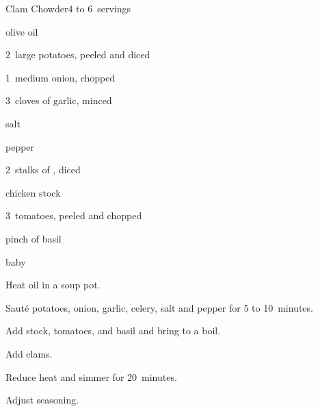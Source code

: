 \begin{recipe}{Clam Chowder}{}{4 to 6~servings}

\begin{ingredients}
\item {} olive oil
\item 2~large potatoes, peeled and diced
\item 1~medium onion, chopped
\item 3~cloves of garlic, minced
\item salt
\item pepper
\item 2~stalks of , diced
\item {} chicken stock
\item 3~tomatoes, peeled and chopped
\item pinch of basil
\item {} baby 
\end{ingredients}

\begin{directions}
\item Heat oil in a soup pot.
\item Sauté potatoes, onion, garlic, celery, salt and pepper for 5 to 10~minutes.
\item Add stock, tomatoes, and basil and bring to a boil.
\item Add clams.
\item Reduce heat and simmer for 20~minutes.
\item Adjust seasoning.
\end{directions}

\end{recipe}
